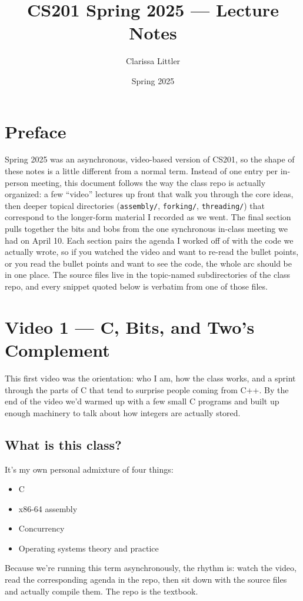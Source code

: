 \documentclass[11pt]{article}
\title{CS201 Spring 2025 --- Lecture Notes}
\author{Clarissa Littler}
\date{Spring 2025}
\begin{document}
\maketitle

\section*{Preface}

Spring 2025 was an asynchronous, video-based version of CS201, so the
shape of these notes is a little different from a normal term. Instead
of one entry per in-person meeting, this document follows the way the
class repo is actually organized: a few ``video'' lectures up front
that walk you through the core ideas, then deeper topical directories
(\texttt{assembly/}, \texttt{forking/}, \texttt{threading/}) that
correspond to the longer-form material I recorded as we went. The
final section pulls together the bits and bobs from the one synchronous
in-class meeting we had on April 10. Each section pairs the agenda I
worked off of with the code we actually wrote, so if you watched the
video and want to re-read the bullet points, or you read the bullet
points and want to see the code, the whole arc should be in one place.
The source files live in the topic-named subdirectories of the class
repo, and every snippet quoted below is verbatim from one of those
files.

\tableofcontents

\section{Video 1 --- C, Bits, and Two's Complement}

This first video was the orientation: who I am, how the class works,
and a sprint through the parts of C that tend to surprise people coming
from C++. By the end of the video we'd warmed up with a few small C
programs and built up enough machinery to talk about how integers are
actually stored.

\subsection*{What is this class?}

It's my own personal admixture of four things:
\begin{itemize}
  \item C
  \item x86-64 assembly
  \item Concurrency
  \item Operating systems theory and practice
\end{itemize}
Because we're running this term asynchronously, the rhythm is: watch
the video, read the corresponding agenda in the repo, then sit down
with the source files and actually compile them. The repo is the
textbook.
\end{document}
